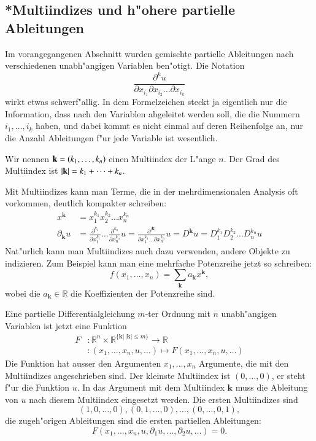 \subsection{*Multiindizes und h"ohere partielle Ableitungen\label{klassifikation:multiindizes}}
Im vorangegangenen Abschnitt wurden gemischte partielle Ableitungen
nach verschiedenen unabh"angigen Variablen ben"otigt. Die Notation
\[
\frac{\partial^k u}{\partial x_{i_1}\partial x_{i_2}\dots\partial x_{i_k}}
\]
wirkt etwas schwerf"allig. In dem Formelzeichen steckt ja eigentlich
nur die Information, dass nach den Variablen abgeleitet werden
soll, die die Nummern $i_1,\dots,i_k$ haben, und dabei kommt es
nicht einmal auf deren Reihenfolge an, nur die Anzahl Ableitungen
f"ur jede Variable ist wesentlich.
\begin{definition}
Wir nennen ${\bf k}=(k_1,\dots,k_n)$ einen Multiindex der L"ange $n$.
Der Grad des Multiindex ist $|{\bf k}|=k_1+\dots+k_n$.
\end{definition}
Mit Multiindizes kann man Terme, die in der mehrdimensionalen
Analysis oft vorkommen, deutlich kompakter schreiben:
\begin{align*}
x^{\mathbf k}&=x_1^{k_1}x_2^{k_2}\dots x_n^{k_n}\\
\partial_{\mathbf k}u
&=\frac{\partial^{k_1}}{\partial x_1^{k_1}}\dots
\frac{\partial^{k_n}}{\partial x_n^{k_n}}u
=\frac{\partial^{|{\mathbf k}|}}{\partial x_1^{k_1}\dots\partial x_n^{k_n}}u
=D^{\mathbf k}u=D_1^{k_1}D_2^{k_2}\dots D_n^{k_n}u
\end{align*}
Nat"urlich kann man Multiindizes auch dazu verwenden, andere 
Objekte zu indizieren. Zum Beispiel kann man eine mehrfache Potenzreihe
jetzt so schreiben:
\[
f(x_1,\dots,x_n)=\sum_{\mathbf k}a_{\mathbf k}x^{\mathbf k},
\]
wobei die $a_{\mathbf k}\in\mathbb R$ die Koeffizienten der Potenzreihe sind.

Eine partielle Differentialgleichung $m$-ter Ordnung mit $n$ unabh"angigen 
Variablen ist jetzt eine Funktion
\begin{align*}
F&\colon \mathbb R^n\times \mathbb R^{\{{\mathbf k}|\,|{\mathbf k}|\le m\}} \to \mathbb R
\\
&\colon(x_1,\dots,x_n,u, \dots)\mapsto F(x_1,\dots,x_n,u,\dots)
\end{align*}
Die Funktion hat ausser den Argumenten $x_1,\dots,x_n$ Argumente,
die mit den Multiindizes angeschrieben sind. Der kleinste Multiindex
ist $(0,\dots,0)$, er steht f"ur die Funktion $u$. In das Argument mit
dem Multiindex ${\mathbf k}$ muss die Ableitung von $u$ nach diesem
Multiindex eingesetzt werden. Die ersten Multiindizes sind
\[
(1,0,\dots,0), (0,1,\dots,0),\dots, (0,\dots, 0,1),
\]
die zugeh"origen Ableitungen sind die
ersten partiellen Ableitungen:
\[
F(x_1,\dots,x_n,u,\partial_1 u,\dots,\partial_2 u,\dots)=0.
\]

